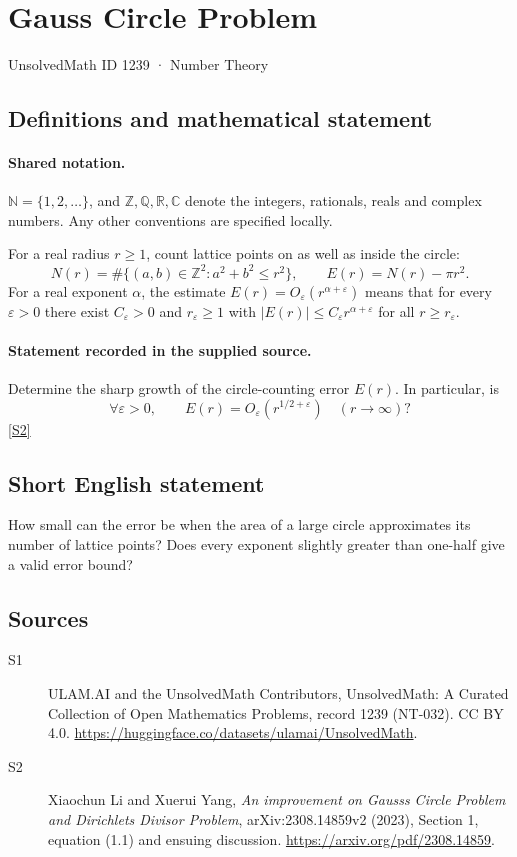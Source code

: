 \documentclass[11pt]{article}
\newcommand{\sref}[2]{\hyperlink{source:#1:#2}{[S#2]}}
\begin{document}
\setcounter{section}{1238}
\section{Gauss Circle Problem}\label{1239}
{\small\sffamily UnsolvedMath ID 1239 · Number Theory}
\subsection{Definitions and mathematical statement}

\paragraph{Shared notation.}$\mathbb N=\{1,2,\ldots\}$, and $\mathbb Z,\mathbb Q,\mathbb R,\mathbb C$ denote the integers, rationals, reals and complex numbers. Any other conventions are specified locally.


For a real radius $r\geq1$, count lattice points on as well as inside the circle:
\[
N(r)=\#\{(a,b)\in\mathbb Z^2:a^2+b^2\leq r^2\},\qquad E(r)=N(r)-\pi r^2.
\]
For a real exponent $\alpha$, the estimate $E(r)=O_{\varepsilon}(r^{\alpha+\varepsilon})$ means that for every $\varepsilon>0$ there exist $C_\varepsilon>0$ and $r_\varepsilon\geq1$ with $|E(r)|\leq C_\varepsilon r^{\alpha+\varepsilon}$ for all $r\geq r_\varepsilon$.
\paragraph{Statement recorded in the supplied source.}
Determine the sharp growth of the circle-counting error $E(r)$. In particular, is
\[
\forall\varepsilon>0,\qquad E(r)=O_\varepsilon(r^{1/2+\varepsilon})\quad(r\to\infty)?
\] \sref{1239}{2}

\subsection{Short English statement}
How small can the error be when the area of a large circle approximates its number of lattice points? Does every exponent slightly greater than one-half give a valid error bound?
\subsection{Sources}
\begin{description}
\item[\hypertarget{source:1239:1}{S1}] ULAM.AI and the UnsolvedMath Contributors, UnsolvedMath: A Curated Collection of Open Mathematics Problems, record 1239 (NT-032). CC BY 4.0. \url{https://huggingface.co/datasets/ulamai/UnsolvedMath}.
\item[\hypertarget{source:1239:2}{S2}] Xiaochun Li and Xuerui Yang, \emph{An improvement on Gauss\textquotesingle s Circle Problem and Dirichlet\textquotesingle s Divisor Problem}, arXiv:2308.14859v2 (2023), Section 1, equation (1.1) and ensuing discussion. \url{https://arxiv.org/pdf/2308.14859}.
\end{description}
\label{end:1239}
\end{document}
